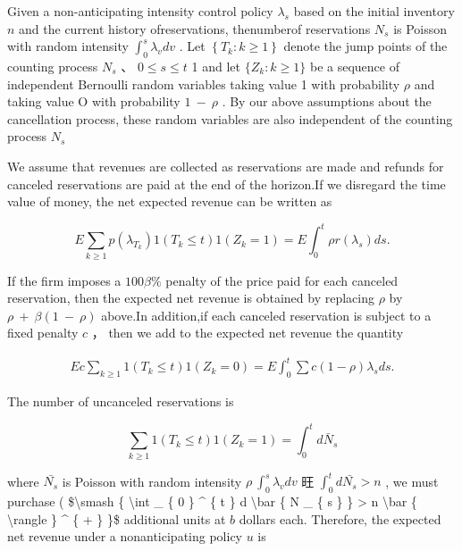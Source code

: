 Given a non-anticipating intensity control policy \(\lambda _ { s }\)
based on the initial inventory \(n\) and the current history
ofreservations, thenumberof reservations \(N _ { s }\) is Poisson with
random intensity \(\int _ { 0 } ^ { s } \lambda _ { v } d v\) . Let
\(\left\{ T _ { k } \colon k \geq 1 \right\}\) denote the jump points of
the counting process \(N _ { s }\) 、 \(0 \leq s \leq t\) 1 and let
\(\{ Z _ { k } \colon k \geq 1 \}\) be a sequence of independent
Bernoulli random variables taking value 1 with probability \(\rho\) and
taking value O with probability \(1 \mathrm { ~ - ~ } \rho\) . By our
above assumptions about the cancellation process, these random variables
are also independent of the counting process \(N _ { s }\)

We assume that revenues are collected as reservations are made and
refunds for canceled reservations are paid at the end of the horizon.If
we disregard the time value of money, the net expected revenue can be
written as

\[
E \sum _ { k \geq 1 } p ( \lambda _ { T _ { k } } ) 1 ( T _ { k } \leq t ) 1 ( Z _ { k } = 1 ) = E \int _ { 0 } ^ { t } \rho r ( \lambda _ { s } ) d s .
\]

If the firm imposes a \(1 0 0 \beta \%\) penalty of the price paid for
each canceled reservation, then the expected net revenue is obtained by
replacing \(\rho\) by
\(\rho \mathrm { ~ + ~ } \beta ( 1 \mathrm { ~ - ~ } \rho )\) above.In
addition,if each canceled reservation is subject to a fixed penalty
\(c\) ， then we add to the expected net revenue the quantity

\[
\begin{array} { r } { E c \sum _ { k \geq 1 } 1 ( T _ { k } \leq t ) 1 ( Z _ { k } = 0 ) = E \displaystyle \int _ { 0 } ^ { t } \sum c ( 1 - \rho ) \lambda _ { s } d s . } \end{array}
\]

The number of uncanceled reservations is

\[
\sum _ { k \geq 1 } 1 ( T _ { k } \leq t ) 1 ( Z _ { k } = 1 ) = \int _ { 0 } ^ { t } d \bar { N } _ { s }
\]

where \(\bar { N _ { s } }\) is Poisson with random intensity
\(\rho \ \int _ { 0 } ^ { s } \lambda _ { v } d v\) 旺
\(\int _ { 0 } ^ { t } d \bar { N _ { s } } > n\) , we must purchase (
{\$\textbackslash smash \{ \textbackslash int \_ \{ 0 \} \^{} \{ t \} d
\textbackslash bar \{ N \_ \{ s \} \} \textgreater{} n
\textbackslash bar \{ \textbackslash rangle \} \^{} \{ + \} \}\$}
additional units at \(b\) dollars each. Therefore, the expected net
revenue under a nonanticipating policy \(u\) is

